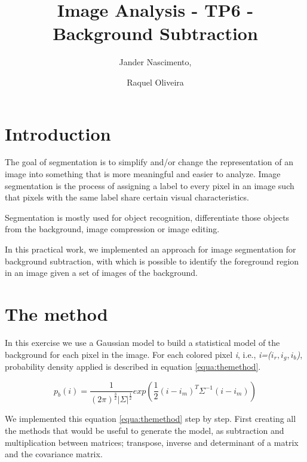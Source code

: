 \documentclass{article}
\begin{document}
\title{Image Analysis - TP6 - Background Subtraction}

\author{Jander Nascimento, 
\and Raquel Oliveira}

\maketitle

\section{Introduction}

The goal of segmentation is to simplify and/or change the representation of an image into something that is more meaningful and easier to analyze. Image segmentation is the process of assigning a label to every pixel in an image such that pixels with the same label share certain visual characteristics.\cite{introduction}

Segmentation is mostly used for object recognition, differentiate those objects from the background, image compression or image editing.

In this practical work, we implemented an approach for image segmentation for background subtraction, with which is possible to identify the foreground region in an image given a set of images of the background.


\section{The method}

In this exercise we use a Gaussian model to build a statistical model of the background for each pixel in the image. For each colored pixel \textit{i}, i.e., \textit{i=($i_r, i_g, i_b$)}, probability density applied is described in equation \ref{equa:themethod}.

\begin{equation}
p_b(i)=\frac{1}{(2\pi)^{\frac{3}{2}}|\Sigma|^{\frac{1}{2}}}exp(\frac{1}{2}(i-i_m)^T\Sigma^{-1}(i-i_m))
\label{equa:themethod}
\end{equation}


We implemented this equation \ref{equa:themethod} step by step. First creating all the methods that would be useful to generate the model, as subtraction and multiplication between matrices; transpose, inverse and determinant of a matrix and the covariance matrix.
\end{document}
